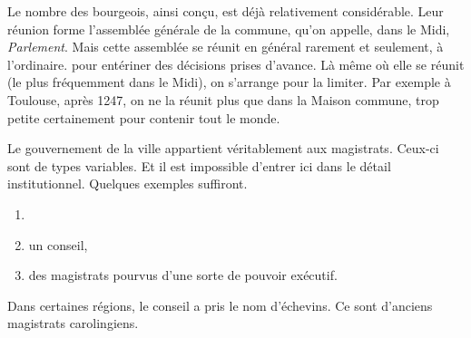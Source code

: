 \documentclass[french,twoside]{book} %
\begin{document}
Le nombre des bourgeois, ainsi conçu, est déjà relativement considérable. Leur réunion forme l’assemblée générale de la commune, qu’on appelle, dans le Midi, \emph{Parlement}. Mais cette assemblée se réunit en général rarement et seulement, à l’ordinaire. pour entériner des décisions prises d’avance. Là même où elle se réunit (le plus fréquemment dans le Midi), on s’arrange pour la limiter. Par exemple à Toulouse, après 1247, on ne la réunit plus que dans la Maison commune, trop petite certainement pour contenir tout le monde.\par
Le gouvernement de la ville appartient véritablement aux magistrats. Ceux-ci sont de types variables. Et il est impossible d’entrer ici dans le détail institutionnel. Quelques exemples suffiront.\par

\begin{enumerate}[itemsep=0pt,]
\item[] \hspace{-1.5em}{\bfseries Dans le Nord, la règle générale est qu’il y a :}
\item un conseil,
\item des magistrats pourvus d’une sorte de pouvoir exécutif.

\end{enumerate}\noindent Dans certaines régions, le conseil a pris le nom d’échevins. Ce sont d’anciens magistrats carolingiens.\par
\end{document}
